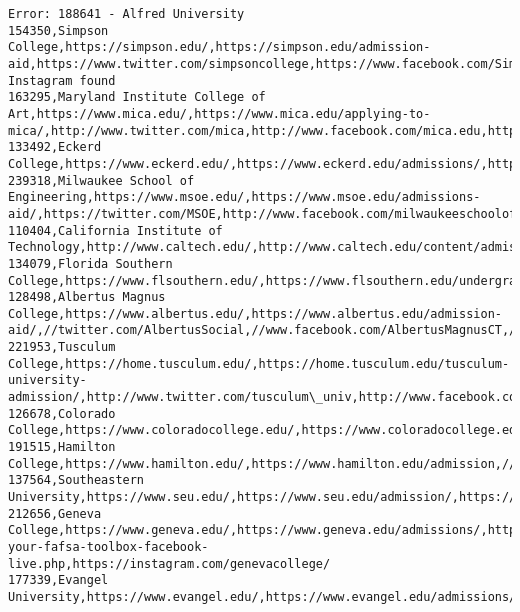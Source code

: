 \documentclass[11pt]{article}
\begin{document}
\begin{Verbatim}[commandchars=\\\{\}]
Error: 188641 - Alfred University
154350,Simpson College,https://simpson.edu/,https://simpson.edu/admission-aid,https://www.twitter.com/simpsoncollege,https://www.facebook.com/SimpsonCollege/,No Instagram found
163295,Maryland Institute College of Art,https://www.mica.edu/,https://www.mica.edu/applying-to-mica/,http://www.twitter.com/mica,http://www.facebook.com/mica.edu,https://www.instagram.com/marylandinstitutecollegeofart/
133492,Eckerd College,https://www.eckerd.edu/,https://www.eckerd.edu/admissions/,https://www.twitter.com/eckerdcollege,https://www.facebook.com/eckerdcollege,https://www.instagram.com/eckerdlife
239318,Milwaukee School of Engineering,https://www.msoe.edu/,https://www.msoe.edu/admissions-aid/,https://twitter.com/MSOE,http://www.facebook.com/milwaukeeschoolofengineering,https://www.instagram.com/msoephoto/
110404,California Institute of Technology,http://www.caltech.edu/,http://www.caltech.edu/content/admissions,http://twitter.com/caltech,http://www.facebook.com/californiainstituteoftechnology,https://instagram.com/caltechedu
134079,Florida Southern College,https://www.flsouthern.edu/,https://www.flsouthern.edu/undergraduate/admissions.aspx,https://twitter.com/flsouthern/,https://www.facebook.com/FloridaSouthern,https://instagram.com/floridasouthern
128498,Albertus Magnus College,https://www.albertus.edu/,https://www.albertus.edu/admission-aid/,//twitter.com/AlbertusSocial,//www.facebook.com/AlbertusMagnusCT,//instagram.com/albertussocial
221953,Tusculum College,https://home.tusculum.edu/,https://home.tusculum.edu/tusculum-university-admission/,http://www.twitter.com/tusculum\_univ,http://www.facebook.com/tusculum.univ,https://instagram.com/tusculum.univ/
126678,Colorado College,https://www.coloradocollege.edu/,https://www.coloradocollege.edu/admission/,https://twitter.com/coloradocollege,https://www.facebook.com/coloradocollege,https://instagram.com/coloradocollege/
191515,Hamilton College,https://www.hamilton.edu/,https://www.hamilton.edu/admission,//twitter.com/hamiltoncollege,//www.facebook.com/HamiltonCollege,//www.instagram.com/hamiltoncollege/
137564,Southeastern University,https://www.seu.edu/,https://www.seu.edu/admission/,https://twitter.com/seuniversity,https://www.facebook.com/seuniversity,https://www.instagram.com/seuniversity/
212656,Geneva College,https://www.geneva.edu/,https://www.geneva.edu/admissions/,http://twitter.com/GenevaCollege,news/2018/10/nr-your-fafsa-toolbox-facebook-live.php,https://instagram.com/genevacollege/
177339,Evangel University,https://www.evangel.edu/,https://www.evangel.edu/admissions/,https://twitter.com/evangeluniv,https://www.facebook.com/evangeluniversity,https://instagram.com/evangel\_university/

\end{Verbatim}
\end{document}
